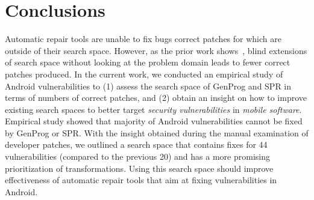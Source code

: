 \section{Conclusions}
\label{section:conclusion}

Automatic repair tools are unable to fix bugs correct patches for which are outside of their search space. However, as the prior work shows~\cite{long2016analysis}, blind extensions of search space without looking at the problem domain leads to fewer correct patches produced. In the current work, we conducted an empirical study of \numvuln Android vulnerabilities to (1) assess the search space of GenProg and SPR in terms of numbers of correct patches, and (2) obtain an insight on how to improve existing search spaces to better target \emph{security vulnerabilities} in \emph{mobile software}. Empirical study showed that majority of Android vulnerabilities cannot be fixed by GenProg or SPR. With the insight obtained during the manual examination of developer patches, we outlined a search space that contains fixes for 44 vulnerabilities (compared to the previous 20) and has a more promising prioritization of transformations. Using this search space should improve effectiveness of automatic repair tools that aim at fixing vulnerabilities in Android.
